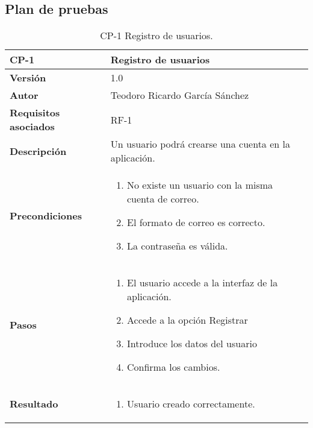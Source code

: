 \subsection{Plan de pruebas}

\begin{table}[p]
	\centering
	\begin{tabularx}{\linewidth}{ p{} p{} }
		\toprule
		\textbf{CP-1}    & \textbf{Registro de usuarios}\\
		\toprule
		\textbf{Versión}              & 1.0    \\
		\textbf{Autor}                & Teodoro Ricardo García Sánchez \\
		\textbf{Requisitos asociados} & RF-1 \\
		\textbf{Descripción}          & Un usuario podrá crearse una cuenta en la aplicación.\\
		\textbf{Precondiciones}         &  
		\begin{enumerate}
			\def\labelenumi{\arabic{enumi}.}
			\tightlist
			\item No existe un usuario con la misma cuenta de correo.
			\item El formato de correo es correcto.
			\item La contraseña es válida.
		\end{enumerate}\\
		\textbf{Pasos}             &
		\begin{enumerate}
			\def\labelenumi{\arabic{enumi}.}
			\tightlist
			\item El usuario accede a la interfaz de la aplicación.
			\item Accede a la opción Registrar
			\item Introduce los datos del usuario
			\item Confirma los cambios.
		\end{enumerate}\\
		\textbf{Resultado}          & 
		\begin{enumerate}
			\item Usuario creado correctamente.
		\end{enumerate}\\
		\bottomrule
	\end{tabularx}
	\caption{CP-1 Registro de usuarios.}
\end{table}

